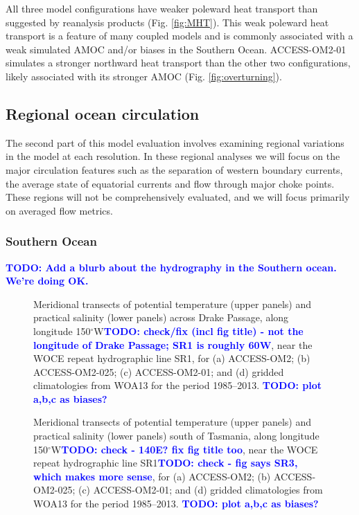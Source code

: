 \documentclass[gmd, manuscript]{copernicus}
\newcommand{\TODO}[1]{\textcolor{blue}{\textsf{\textbf{TODO: #1}}}}
\begin{document}
All three model configurations have weaker poleward heat transport than suggested by reanalysis products (Fig. \ref{fig:MHT}).
This weak poleward heat transport is a feature of many coupled models \citet[e.g.][]{Griffies2015} and is commonly associated with a weak simulated AMOC \citep{Wang2014} and/or biases in the Southern Ocean.
ACCESS-OM2-01 simulates a stronger northward heat transport than the other two configurations, likely associated with its stronger AMOC (Fig. \ref{fig:overturning}).

\subsection{Regional ocean circulation}\label{sec:regional}

The second part of this model evaluation involves examining regional variations in the model at each resolution. 
In these regional analyses we will focus on the major circulation features such as the separation of western boundary currents, the average state of equatorial currents and flow through major choke points. 
These regions will not be comprehensively evaluated, and we will focus primarily on averaged flow metrics.


\subsubsection{Southern Ocean}


\TODO{Add a blurb about the hydrography in the Southern ocean. We're doing OK. }
\begin{figure}[t]
\caption{Meridional transects of potential temperature (upper panels) and practical salinity (lower panels) across Drake Passage, along longitude 150$^{\circ}$W\TODO{check/fix (incl fig title) - not the longitude of Drake Passage; SR1 is roughly 60W}, near the WOCE repeat hydrographic line SR1, for (a)  ACCESS-OM2; (b) ACCESS-OM2-025; (c) ACCESS-OM2-01;  and (d) gridded climatologies from WOA13 for the period 1985--2013. 
\TODO{plot a,b,c as biases?}
\label{fig:SR1}}
\end{figure}

\begin{figure}[t]
\caption{Meridional transects of potential temperature (upper panels) and practical salinity (lower panels) south of Tasmania, along longitude 150$^{\circ}$W\TODO{check - 140E? fix fig title too}, near the WOCE repeat hydrographic line SR1\TODO{check - fig says SR3, which makes more sense}, for (a)  ACCESS-OM2; (b) ACCESS-OM2-025; (c) ACCESS-OM2-01;  and (d) gridded climatologies from WOA13 for the period 1985--2013. 
\TODO{plot a,b,c as biases?}
\label{fig:SR3}}
\end{figure}
\end{document}
